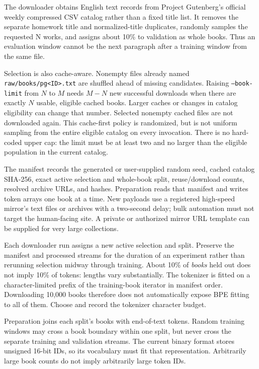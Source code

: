 \documentclass[11pt]{article}
\begin{document}
The downloader obtains English text records from Project Gutenberg's official
weekly compressed CSV catalog rather than a fixed title list. It removes the
separate homework title and normalized-title duplicates, randomly samples the
requested N works, and assigns about 10\% to validation as whole books. Thus an
evaluation window cannot be the next paragraph after a training window from the
same file.

Selection is also cache-aware. Nonempty files already named
\texttt{raw/books/pg<ID>.txt} are shuffled ahead of missing candidates. Raising
\texttt{--book-limit} from $N$ to $M$ needs $M-N$ new successful downloads when
there are exactly $N$ usable, eligible cached books. Larger caches or changes in
catalog eligibility can change that number. Selected nonempty cached files are
not downloaded again. This cache-first policy is randomized, but is not uniform
sampling from the entire eligible catalog on every invocation.
There is no hard-coded upper cap: the limit must be at least two and no larger
than the eligible population in the current catalog.

The manifest records the generated or user-supplied random seed, cached catalog
SHA-256, exact active selection and whole-book split, reuse/download counts,
resolved archive URLs, and hashes. Preparation reads that manifest and writes
token arrays one book at a time. New payloads use a registered high-speed
mirror's text files or archives with a two-second delay; bulk automation must not
target the human-facing site. A private or authorized mirror URL template can be
supplied for very large collections.

Each downloader run assigns a new active selection and split. Preserve the
manifest and processed streams for the duration of an experiment rather than
rerunning selection midway through training. About 10\% of \emph{books} held
out does not imply 10\% of tokens: lengths vary substantially. The tokenizer is
fitted on a character-limited prefix of the training-book iterator in manifest
order. Downloading 10,000 books therefore does not automatically expose BPE
fitting to all of them. Choose and record the tokenizer character budget.

Preparation joins each split's books with end-of-text tokens. Random training
windows may cross a book boundary within one split, but never cross the separate
training and validation streams. The current binary format stores unsigned
16-bit IDs, so its vocabulary must fit that representation. Arbitrarily large
book counts do not imply arbitrarily large token IDs.
\end{document}
